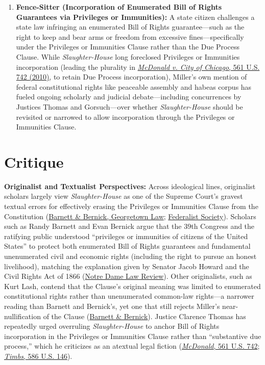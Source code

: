 \documentclass[12pt]{article}
\begin{document}
\begin{enumerate}
  \item \textbf{Fence-Sitter (Incorporation of Enumerated Bill of Rights Guarantees via Privileges or Immunities):} A state citizen challenges a state law infringing an enumerated Bill of Rights guarantee---such as the right to keep and bear arms or freedom from excessive fines---specifically under the Privileges or Immunities Clause rather than the Due Process Clause. While \textit{Slaughter-House} long foreclosed Privileges or Immunities incorporation (leading the plurality in \href{https://supreme.justia.com/cases/federal/us/561/742/}{\textit{McDonald v. City of Chicago}, 561 U.S. 742 (2010)}, to retain Due Process incorporation), Miller's own mention of federal constitutional rights like peaceable assembly and habeas corpus has fueled ongoing scholarly and judicial debate---including concurrences by Justices Thomas and Gorsuch---over whether \textit{Slaughter-House} should be revisited or narrowed to allow incorporation through the Privileges or Immunities Clause.
\end{enumerate}

\section{Critique}

\textbf{Originalist and Textualist Perspectives:} Across ideological lines, originalist scholars largely view \textit{Slaughter-House} as one of the Supreme Court's gravest textual errors for effectively erasing the Privileges or Immunities Clause from the Constitution (\href{https://scholarship.law.georgetown.edu/facpub/2147/}{Barnett \& Bernick, Georgetown Law}; \href{https://fedsoc.org/fedsoc-review/protecting-economic-liberty-in-the-federal-courts-theory-precedent-practice}{Federalist Society}). Scholars such as Randy Barnett and Evan Bernick argue that the 39th Congress and the ratifying public understood ``privileges or immunities of citizens of the United States'' to protect both enumerated Bill of Rights guarantees and fundamental unenumerated civil and economic rights (including the right to pursue an honest livelihood), matching the explanation given by Senator Jacob Howard and the Civil Rights Act of 1866 (\href{https://scholarship.law.nd.edu/ndlr/vol95/iss2/1/}{Notre Dame Law Review}). Other originalists, such as Kurt Lash, contend that the Clause's original meaning was limited to enumerated constitutional rights rather than unenumerated common-law rights---a narrower reading than Barnett and Bernick's, yet one that still rejects Miller's near-nullification of the Clause (\href{https://scholarship.law.georgetown.edu/facpub/2147/}{Barnett \& Bernick}). Justice Clarence Thomas has repeatedly urged overruling \textit{Slaughter-House} to anchor Bill of Rights incorporation in the Privileges or Immunities Clause rather than ``substantive due process,'' which he criticizes as an atextual legal fiction (\href{https://supreme.justia.com/cases/federal/us/561/742/}{\textit{McDonald}, 561 U.S. 742}; \href{https://www.law.cornell.edu/supremecourt/text/17-1091}{\textit{Timbs}, 586 U.S. 146}).
\end{document}
